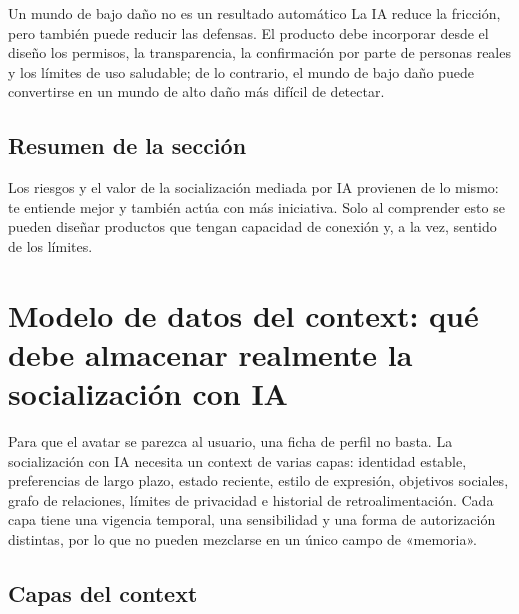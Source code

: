 \documentclass[a4paper]{article}
\begin{document}
\begin{warningbox}{Un mundo de bajo daño no es un resultado automático}
La IA reduce la fricción, pero también puede reducir las defensas. El producto debe incorporar desde el diseño los permisos, la transparencia, la confirmación por parte de personas reales y los límites de uso saludable; de lo contrario, el mundo de bajo daño puede convertirse en un mundo de alto daño más difícil de detectar.
\end{warningbox}

\subsection{Resumen de la sección}

Los riesgos y el valor de la socialización mediada por IA provienen de lo mismo: te entiende mejor y también actúa con más iniciativa. Solo al comprender esto se pueden diseñar productos que tengan capacidad de conexión y, a la vez, sentido de los límites.
\section{Modelo de datos del context: qué debe almacenar realmente la socialización con IA}

Para que el avatar se parezca al usuario, una ficha de perfil no basta. La socialización con IA necesita un context de varias capas: identidad estable, preferencias de largo plazo, estado reciente, estilo de expresión, objetivos sociales, grafo de relaciones, límites de privacidad e historial de retroalimentación. Cada capa tiene una vigencia temporal, una sensibilidad y una forma de autorización distintas, por lo que no pueden mezclarse en un único campo de «memoria».

\subsection{Capas del context}
\end{document}
